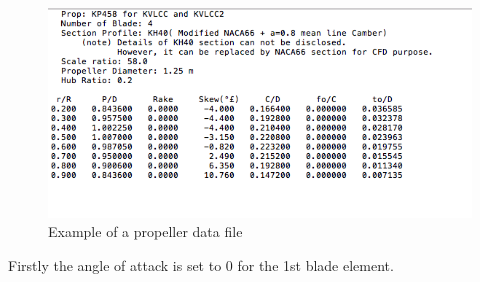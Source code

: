 \documentclass[]{report}
\begin{document}
\begin{figure}
	\centering
	\includegraphics[scale=0.5]{prop_data_file_example}
	\caption{Example of a propeller data file}
	\label{fig:prop dat file}
\end{figure}
Firstly the angle of attack is set to 0 for the 1st blade element.
\end{document}
